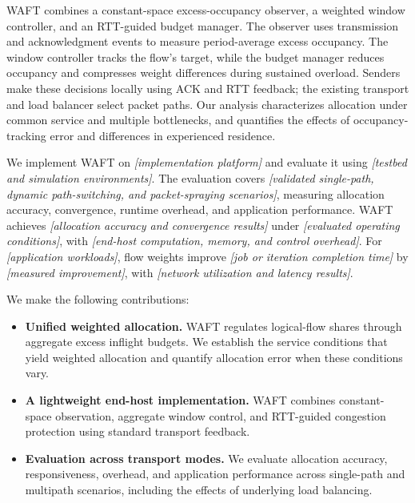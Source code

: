 WAFT combines a constant-space excess-occupancy observer, a weighted window controller, and an RTT-guided budget manager. The observer uses transmission and acknowledgment events to measure period-average excess occupancy. The window controller tracks the flow's target, while the budget manager reduces occupancy and compresses weight differences during sustained overload. Senders make these decisions locally using ACK and RTT feedback; the existing transport and load balancer select packet paths. Our analysis characterizes allocation under common service and multiple bottlenecks, and quantifies the effects of occupancy-tracking error and differences in experienced residence.

We implement WAFT on \emph{[implementation platform]} and evaluate it using \emph{[testbed and simulation environments]}. The evaluation covers \emph{[validated single-path, dynamic path-switching, and packet-spraying scenarios]}, measuring allocation accuracy, convergence, runtime overhead, and application performance. WAFT achieves \emph{[allocation accuracy and convergence results]} under \emph{[evaluated operating conditions]}, with \emph{[end-host computation, memory, and control overhead]}. For \emph{[application workloads]}, flow weights improve \emph{[job or iteration completion time]} by \emph{[measured improvement]}, with \emph{[network utilization and latency results]}.

We make the following contributions:

\begin{itemize}
\item \textbf{Unified weighted allocation.} WAFT regulates logical-flow shares through aggregate excess inflight budgets. We establish the service conditions that yield weighted allocation and quantify allocation error when these conditions vary.
\item \textbf{A lightweight end-host implementation.} WAFT combines constant-space observation, aggregate window control, and RTT-guided congestion protection using standard transport feedback.
\item \textbf{Evaluation across transport modes.} We evaluate allocation accuracy, responsiveness, overhead, and application performance across single-path and multipath scenarios, including the effects of underlying load balancing.
\end{itemize}


